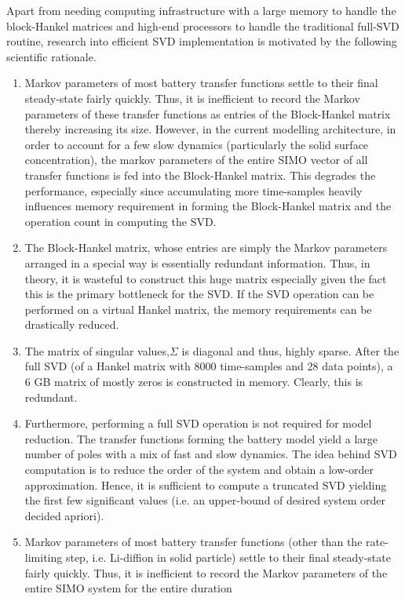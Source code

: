 Apart from needing computing infrastructure with a large memory to
handle the block-Hankel matrices and high-end processors to handle
the traditional full-SVD routine, research into efficient SVD implementation
is motivated by the following scientific rationale.
\begin{enumerate}
\item Markov parameters of most battery transfer functions settle to their
final steady-state fairly quickly. Thus, it is inefficient to record
the Markov parameters of these transfer functions as entries of the
Block-Hankel matrix thereby increasing its size. However, in the current
modelling architecture, in order to account for a few slow dynamics
(particularly the solid surface concentration), the markov parameters
of the entire SIMO vector of all transfer functions is fed into the
Block-Hankel matrix. This degrades the performance, especially since
accumulating more time-samples heavily influences memory requirement
in forming the Block-Hankel matrix and the operation count in computing
the SVD.
\item The Block-Hankel matrix, whose entries are simply the Markov parameters
arranged in a special way is essentially redundant information. Thus,
in theory, it is wasteful to construct this huge matrix especially
given the fact this is the primary bottleneck for the SVD. If the
SVD operation can be performed on a virtual Hankel matrix, the memory
requirements can be drastically reduced.
\item The matrix of singular values,$\Sigma$ is diagonal and thus, highly
sparse. After the full SVD (of a Hankel matrix with 8000 time-samples
and 28 data points), a 6 GB matrix of mostly zeros is constructed
in memory. Clearly, this is redundant.
\item Furthermore, performing a full SVD operation is not required for model
reduction. The transfer functions forming the battery model yield
a large number of poles with a mix of fast and slow dynamics. The
idea behind SVD computation is to reduce the order of the system and
obtain a low-order approximation. Hence, it is sufficient to compute
a truncated SVD yielding the first few significant values (i.e. an
upper-bound of desired system order decided apriori).
\item Markov parameters of most battery transfer functions (other than the
rate-limiting step, i.e. Li-diffion in solid particle) settle to their
final steady-state fairly quickly. Thus, it is inefficient to record
the Markov parameters of the entire SIMO system for the entire duration

\end{enumerate}
